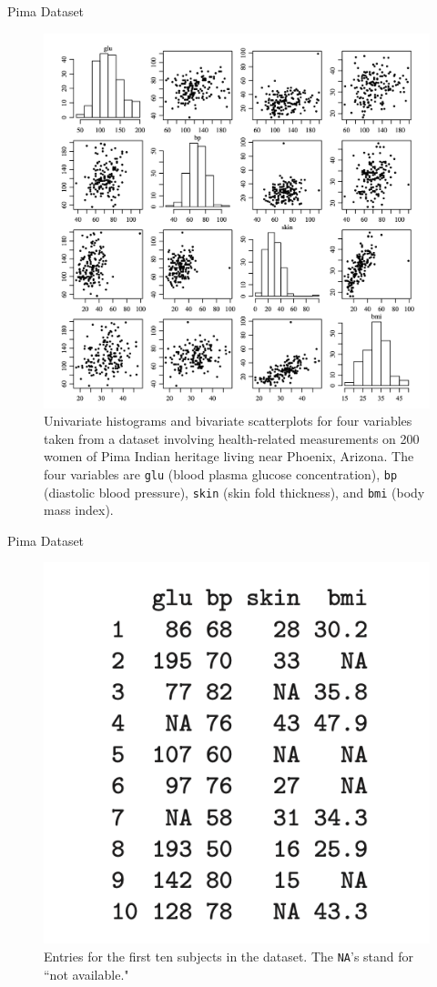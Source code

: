 \documentclass[10pt]{beamer}
\begin{document}
\begin{frame}{Pima Dataset}

\begin{figure}
\includegraphics[width=.6\textwidth]{images/pima_scatterplots}
\caption{  \footnotesize Univariate histograms and bivariate scatterplots for four variables taken from a dataset involving health-related measurements on 200 women of Pima Indian heritage living near Phoenix,  Arizona.  \scriptsize The four variables are \texttt{glu} (blood plasma glucose concentration),  \texttt{bp} (diastolic blood pressure),  \texttt{skin} (skin fold thickness),  and  \texttt{bmi} (body mass index).  }
\end{figure}

\end{frame}

\begin{frame}{Pima Dataset}

\begin{figure}
\includegraphics[width=.6\textwidth]{images/pima_first_ten_entries}
\caption{  \footnotesize Entries for the first ten subjects in the dataset.  \scriptsize The \texttt{NA}'s stand for ``not available." }
\end{figure}
\end{frame}
\end{document}
